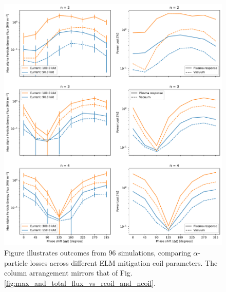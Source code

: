 \documentclass[10pt, a4paper, twoside]{article}
\begin{document}
\begin{figure}[!htb]
    \centering
    \includegraphics[width=0.99\linewidth]{Figures/max_and_total_flux_vs_phase.pdf}
    \caption{Figure illustrates outcomes from 96 simulations, comparing $\alpha$-particle losses across different ELM mitigation coil parameters. The column arrangement mirrors that of Fig. \ref{fig:max_and_total_flux_vs_rcoil_and_ncoil}.}
    \label{fig:max_and_total_flux_vs_phase}
\end{figure}
\end{document}
